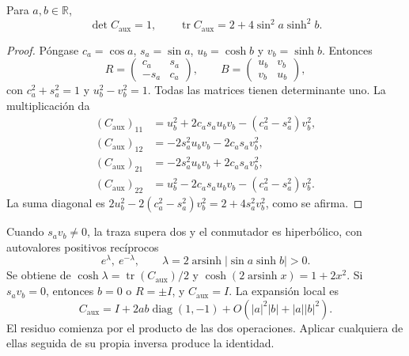 \begin{proposition}
\label{md:aux:prop-traza}
Para $a,b\in\mathbb R$,
\begin{equation}
 \det C_{\mathrm{aux}}=1,\qquad
 \operatorname{tr}C_{\mathrm{aux}}=2+4\sin^2a\sinh^2b.
 \label{md:aux:traza-compensado}
\end{equation}
\end{proposition}
\begin{proof}
Póngase $c_a=\cos a$, $s_a=\sin a$, $u_b=\cosh b$ y $v_b=\sinh b$.
Entonces
\[
 R=\begin{pmatrix}c_a&s_a\\-s_a&c_a\end{pmatrix},\qquad
 B=\begin{pmatrix}u_b&v_b\\v_b&u_b\end{pmatrix},
\]
con $c_a^2+s_a^2=1$ y $u_b^2-v_b^2=1$. Todas las matrices tienen
determinante uno. La multiplicación da
\begin{equation}
 \begin{aligned}
 (C_{\mathrm{aux}})_{11}&=u_b^2+2c_as_au_bv_b-(c_a^2-s_a^2)v_b^2,\\
 (C_{\mathrm{aux}})_{12}&=-2s_a^2u_bv_b-2c_as_av_b^2,\\
 (C_{\mathrm{aux}})_{21}&=-2s_a^2u_bv_b+2c_as_av_b^2,\\
 (C_{\mathrm{aux}})_{22}&=u_b^2-2c_as_au_bv_b-(c_a^2-s_a^2)v_b^2.
 \end{aligned}
 \label{md:aux:entradas-compensado}
\end{equation}
La suma diagonal es
$2u_b^2-2(c_a^2-s_a^2)v_b^2=2+4s_a^2v_b^2$, como se afirma.
\end{proof}

Cuando $s_av_b\ne0$, la traza supera dos y el conmutador es
hiperbólico, con autovalores positivos recíprocos
\begin{equation}
 e^{\lambda},\ e^{-\lambda},\qquad
 \lambda=2\operatorname{arsinh}|\sin a\sinh b|>0.
 \label{md:aux:espectro-compensado}
\end{equation}
Se obtiene de $\cosh\lambda=\operatorname{tr}(C_{\mathrm{aux}})/2$
y $\cosh(2\operatorname{arsinh}x)=1+2x^2$.
Si $s_av_b=0$, entonces $b=0$ o $R=\pm I$, y
$C_{\mathrm{aux}}=I$.
La expansión local es
\begin{equation}
 C_{\mathrm{aux}}=I+2ab\operatorname{diag}(1,-1)
 +O(|a|^2|b|+|a||b|^2).
 \label{md:aux:expansion-compensado}
\end{equation}
El residuo comienza por el producto de las dos operaciones. Aplicar
cualquiera de ellas seguida de su propia inversa produce la identidad.

